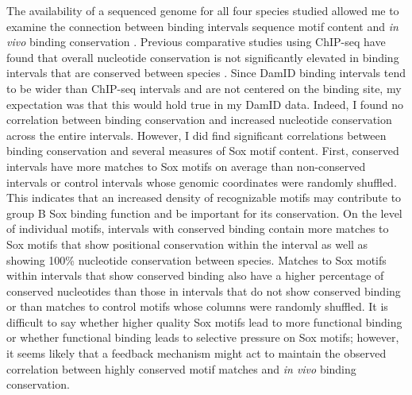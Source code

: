 The availability of a sequenced genome for all four species studied allowed me to examine the connection between binding intervals sequence motif content and \emph{in vivo} binding conservation \cite{clark_evolution_2007}. Previous comparative studies using ChIP-seq have found that overall nucleotide conservation is not significantly elevated in binding intervals that are conserved between species \citep{bradley_binding_2010,he_high_2011}. Since DamID binding intervals tend to be wider than ChIP-seq intervals and are not centered on the binding site, my expectation was that this would hold true in my DamID data. Indeed, I found no correlation between binding conservation and increased nucleotide conservation across the entire intervals. However, I did find significant correlations between binding conservation and several measures of Sox motif content. First, conserved intervals have more matches to Sox motifs on average than non-conserved intervals or control intervals whose genomic coordinates were randomly shuffled. This indicates that an increased density of recognizable motifs may contribute to group B Sox binding function and be important for its conservation. On the level of individual motifs, intervals with conserved binding contain more matches to Sox motifs that show positional conservation within the interval as well as showing 100\% nucleotide conservation between species. Matches to Sox motifs within intervals that show conserved binding also have a higher percentage of conserved nucleotides than those in intervals that do not show conserved binding or than matches to control motifs whose columns were randomly shuffled. It is difficult to say whether higher quality Sox motifs lead to more functional binding or whether functional binding leads to selective pressure on Sox motifs; however, it seems likely that a feedback mechanism might act to maintain the observed correlation between highly conserved motif matches and \emph{in vivo} binding conservation.\\

